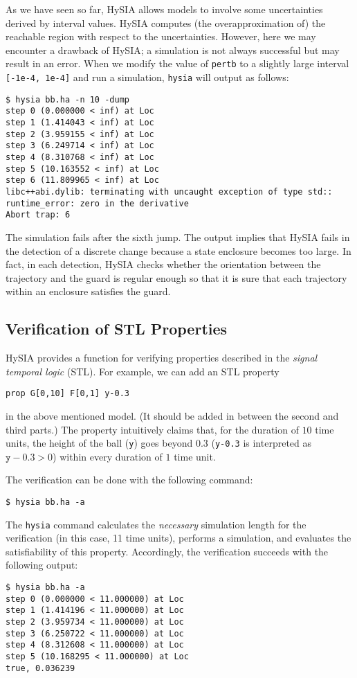 \documentclass[12pt,a4paper]{article}
\begin{document}
As we have seen so far, HySIA allows models to involve some uncertainties derived by interval values.
HySIA computes (the overapproximation of) the reachable region with respect to the uncertainties.
However, here we may encounter a drawback of HySIA; a simulation is not always successful but may result in an error.
%
When we modify the value of \verb|pertb| to a slightly large interval \verb|[-1e-4, 1e-4]| and run a simulation, \verb|hysia| will output as follows:
\begin{verbatim}
$ hysia bb.ha -n 10 -dump
step 0 (0.000000 < inf) at Loc
step 1 (1.414043 < inf) at Loc
step 2 (3.959155 < inf) at Loc
step 3 (6.249714 < inf) at Loc
step 4 (8.310768 < inf) at Loc
step 5 (10.163552 < inf) at Loc
step 6 (11.809965 < inf) at Loc
libc++abi.dylib: terminating with uncaught exception of type std::
runtime_error: zero in the derivative
Abort trap: 6
\end{verbatim}
The simulation fails after the sixth jump. The output implies that HySIA fails in the detection of a discrete change because a state enclosure becomes too large.
In fact, in each detection, HySIA checks whether the orientation between the trajectory and the guard is regular enough so that it is sure that each trajectory within an enclosure satisfies the guard.


\subsection{Verification of STL Properties}

HySIA provides a function for verifying properties described in the \emph{signal temporal logic} (STL).
For example, we can add an STL property 
\begin{lstlisting}
prop G[0,10] F[0,1] y-0.3
\end{lstlisting}
in the above mentioned model.
(It should be added in between the second and third parts.)
The property intuitively claims that, for the duration of $10$ time units, the height of the ball (\verb|y|) goes beyond $0.3$ (\verb|y-0.3| is interpreted as $\texttt{y} - 0.3 > 0$) within every duration of $1$ time unit.

The verification can be done with the following command:
\begin{verbatim}
$ hysia bb.ha -a
\end{verbatim}
The \verb|hysia| command calculates the \emph{necessary} simulation length for the verification (in this case, 11 time units), performs a simulation, and evaluates the satisfiability of this property.
Accordingly, the verification succeeds with the following output:
\begin{verbatim}
$ hysia bb.ha -a
step 0 (0.000000 < 11.000000) at Loc
step 1 (1.414196 < 11.000000) at Loc
step 2 (3.959734 < 11.000000) at Loc
step 3 (6.250722 < 11.000000) at Loc
step 4 (8.312608 < 11.000000) at Loc
step 5 (10.168295 < 11.000000) at Loc
true, 0.036239
\end{verbatim}
\end{document}
